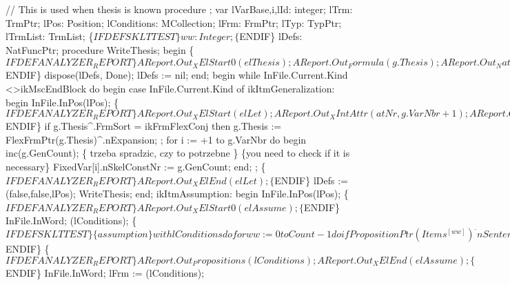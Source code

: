 // This is used when thesis is known
procedure ;
var
   lVarBase,i,lId: integer;
   lTrm: TrmPtr;
   lPos: Position;
   lConditions: MCollection;
   lFrm: FrmPtr;
   lTyp: TypPtr;
   lTrmList: TrmList;
   \{$IFDEF SKLTTEST\} ww: Integer; \{$ENDIF\}
   lDefs: NatFuncPtr;
procedure WriteThesis;
begin
   \{$IFDEF ANALYZER_REPORT\}
   AReport.Out_XElStart0(elThesis);
   AReport.Out_Formula(g.Thesis);
   AReport.Out_NatFunc(elThesisExpansions, lDefs^);
   AReport.Out_XElEnd(elThesis);
   \{$ENDIF\}
   dispose(lDefs, Done); lDefs := nil;
end;
begin
   while InFile.Current.Kind <>ikMscEndBlock do
   begin
      case InFile.Current.Kind of
         ikItmGeneralization:
            begin
               InFile.InPos(lPos);
               \{$IFDEF ANALYZER_REPORT\}
               AReport.Out_XElStart(elLet);
               AReport.Out_XIntAttr(atNr, g.VarNbr+1);
               AReport.Out_XAttrEnd;
               \{$ENDIF\}
               if g.Thesis^.FrmSort = ikFrmFlexConj then
                  g.Thesis := FlexFrmPtr(g.Thesis)^.nExpansion;
               ;
               for i := +1 to g.VarNbr do
               begin
                  inc(g.GenCount); \{ trzeba spradzic, czy to potrzebne \}
                  \{you need to check if it is necessary\}
                  FixedVar[i].nSkelConstNr := g.GenCount;
               end;
               ;
               \{$IFDEF ANALYZER_REPORT\}
               AReport.Out_XElEnd(elLet);
               \{$ENDIF\}
               lDefs := (false,false,lPos);
               WriteThesis;
            end;
         ikItmAssumption:
            begin
               InFile.InPos(lPos);
               \{$IFDEF ANALYZER_REPORT\}
               AReport.Out_XElStart0(elAssume);
               \{$ENDIF\}
               InFile.InWord;
               (lConditions);
               \{$IFDEF SKLTTEST\} \{assumption\}
                   with lConditions do for ww := 0 to Count-1 do
                      if PropositionPtr(Items^[ww])^.nSentence^.FrmSort = ikFrmConj then
                             WrongSkeleton('Too complex assumption',lPos);
               \{$ENDIF\}
               \{$IFDEF ANALYZER_REPORT\}
               AReport.Out_Propositions(lConditions);
               AReport.Out_XElEnd(elAssume);
               \{$ENDIF\}
               InFile.InWord;
               lFrm := (lConditions);
